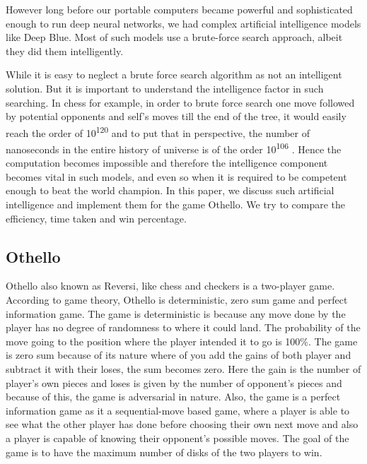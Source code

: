 \documentclass{svproc}
\begin{document}
However long before our portable computers became powerful and sophisticated enough to run deep neural networks, we had complex artificial intelligence models like Deep Blue. Most of such models use a brute-force search approach, albeit they did them intelligently.

While it is easy to neglect a brute force search algorithm as not an intelligent solution. But it is important to understand the intelligence factor in such searching. In chess for example, in order to brute force search one move followed by potential opponents and self's moves till the end of the tree, it would easily reach the order of 10\textsuperscript{120} and to put that in perspective, the number of nanoseconds in the entire history of universe is of the order 10\textsuperscript{106} \cite{MIT_lecture}. Hence the computation becomes impossible and therefore the intelligence component becomes vital in such models, and even so when it is required to be competent enough to beat the world champion. In this paper, we discuss such artificial intelligence and implement them for the game Othello. We try to compare the efficiency, time taken and win percentage.

\subsection{Othello}

Othello also known as Reversi, like chess and checkers is a two-player game. According to game theory, Othello is deterministic, zero sum game and perfect information game. The game is deterministic is because any move done by the player has no degree of randomness to where it could land. The probability of the move going to the position where the player intended it to go is 100\%. The game is zero sum because of its nature where of you add the gains of both player and subtract it with their loses, the sum becomes zero. Here the gain is the number of player's own pieces and loses is given by the number of opponent's pieces and because of this, the game is adversarial in nature. Also, the game is a perfect information game as it a sequential-move based game, where a player is able to see what the other player has done before choosing their own next move and also a player is capable of knowing their opponent's possible moves. The goal of the game is to have the maximum number of disks of the two players to win.
\end{document}
